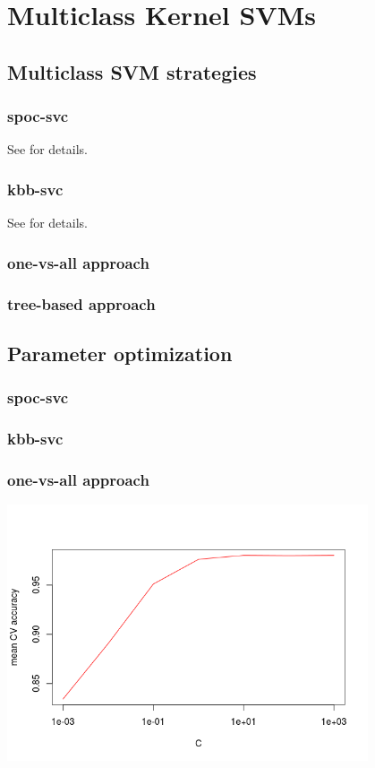 
\section{Multiclass Kernel SVMs}


\subsection{Multiclass SVM strategies}

\subsubsection{spoc-svc}

See \cite{spoc-svc} for details.


\subsubsection{kbb-svc}

See \cite{kbb-svc} for details.


\subsubsection{one-vs-all approach}


\subsubsection{tree-based approach}



\subsection{Parameter optimization}

\subsubsection{spoc-svc}

\subsubsection{kbb-svc}

\subsubsection{one-vs-all approach}

\includegraphics[width=0.8\textwidth]{../plots/one_vs_all_zip}

